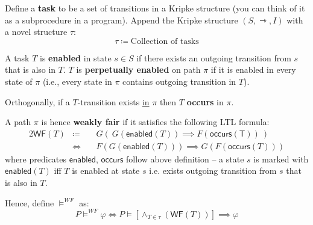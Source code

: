 \documentclass[99-notes-packed.tex]{subfiles}
\begin{document}
\begin{definition}
    Define a \textbf{task} to be a set of transitions in a Kripke structure (you can think of it as a subprocedure in a program). Append the Kripke structure $(S, \rightarrowtriangle, I)$ with a novel structure $\tau$: 
    \begin{equation*}
        \tau \coloneqq \textrm{Collection of tasks}
    \end{equation*}

    A task $T$ is \textbf{enabled} in state $s \in S$ if there exists an outgoing transition from $s$ that is also in $T$. $T$ is \textbf{perpetually enabled} on path $\pi$ if it is enabled in every state of $\pi$ (i.e., every state in $\pi$ contains outgoing transition in $T$). 
    
    Orthogonally, if a $T$-transition exists \underline{in} $\pi$ then $T$ \textbf{occurs} in $\pi$.

    A path $\pi$ is hence \textbf{weakly fair} if it satisfies the following LTL formula:
    \begin{alignat*}{2}
        \mathsf{WF}(T) 
        &\coloneqq &&\ G(\ G(\mathsf{enabled}(T)) \implies F(\mathsf{occurs(T)})\ ) \\ 
        &\Leftrightarrow &&\ F(G(\mathsf{enabled}(T))) \implies G(F(\mathsf{occurs}(T)))
    \end{alignat*}
    where predicates $\mathsf{enabled}$, $\mathsf{occurs}$ follow above definition -- a state $s$ is marked with $\mathsf{enabled}(T)$ iff $T$ is enabled at state $s$ i.e. exists outgoing transition from $s$ that is also in $T$.

    Hence, define $\models^{WF}$ as: 
    \begin{equation*}
        P \models^{WF} \varphi \iff P \models [\wedge_{T \in \tau} {(\mathsf{WF}(T))}] \implies \varphi
    \end{equation*}
\end{definition}

\begin{definition}
    
\end{definition}
\end{document}
